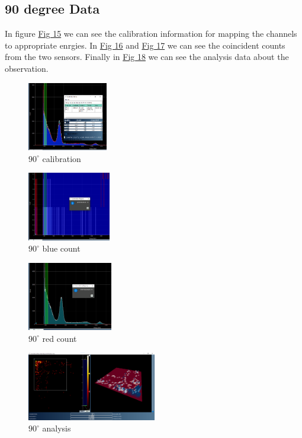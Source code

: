 	\subsection{90 degree Data}
		In figure \hyperref[obs:90cal]{Fig 15} we can see the calibration information for mapping the channels to appropriate enrgies. In \hyperref[obs:90blue]{Fig 16} and \hyperref[obs:90red]{Fig 17} we can see the coincident counts from the two sensors. Finally in \hyperref[obs:90]{Fig 18} we can see the analysis data about the observation.
		\begin{figure}[H]
			\centering
			\includegraphics[width=0.7\columnwidth, height=3cm]{images/90_cal.png}
			\caption{$90^\circ$ calibration}
			\label{obs:90cal}
		\end{figure}
		\begin{figure}[H]
			\centering
			\includegraphics[width=0.7\columnwidth, height=3cm]{images/90blue.png}
			\caption{$90^\circ$ blue count}
			\label{obs:90blue}
		\end{figure}
		\begin{figure}[H]
			\centering
			\includegraphics[width=0.7\columnwidth, height=3cm]{images/90red.png}
			\caption{$90^\circ$ red count}
			\label{obs:90red}
		\end{figure}
		\begin{figure}[H]
			\centering
			\includegraphics[width=0.7\columnwidth, height=3cm]{images/90.png}
			\caption{$90^\circ$ analysis}
			\label{obs:90}
		\end{figure}
